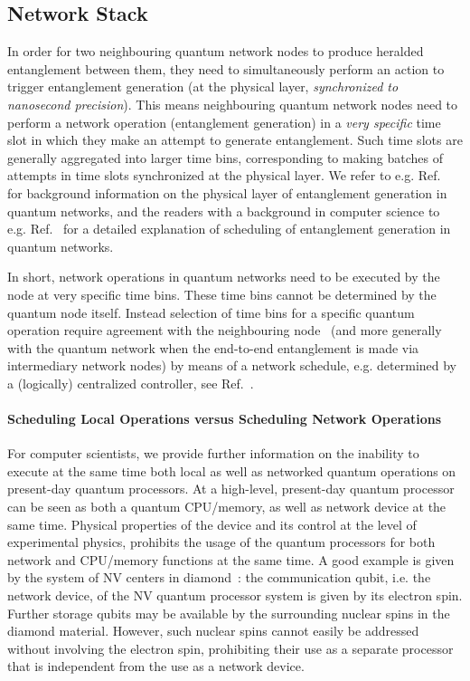 \subsection{Network Stack}
In order for two neighbouring quantum network nodes to produce heralded entanglement between them, they need to simultaneously perform an action to trigger entanglement generation (at the physical layer, \emph{synchronized to nanosecond precision}). This means neighbouring quantum network nodes need to perform a network operation (entanglement generation) in a \emph{very specific} time slot in which they make an attempt to generate entanglement. Such time slots are generally aggregated into larger time bins, corresponding to making batches of attempts in time slots synchronized at the physical layer. We refer to e.g. Ref.~\cite{pompili_2022_experimental} for background information on the physical layer of entanglement generation in quantum networks, and the readers with a background in computer science to e.g. Ref.~\cite{dahlberg_2019_egp} for a detailed explanation of scheduling of entanglement generation in quantum networks.

In short, network operations in quantum networks need to be executed by the node at very specific time bins. These time bins cannot be determined by the quantum node itself. Instead selection of time bins for a specific quantum operation require agreement with the neighbouring node~\cite{dahlberg_2019_egp} (and more generally with the quantum network when the end-to-end entanglement is made via intermediary network nodes) by means of a network schedule, e.g. determined by a (logically) centralized controller, see Ref.~\cite{skrzypczyk_2021_arch}.

\paragraph{Scheduling Local Operations versus Scheduling Network Operations}

For computer scientists, we provide further information on the inability to execute at the same time both local as well as networked quantum operations on present-day quantum processors. At a high-level, present-day quantum processor can be seen as both a quantum \ac{CPU}/memory, as well as network device at the same time. Physical properties of the device and its control at the level of experimental physics, prohibits the usage of the quantum processors for both network and \ac{CPU}/memory functions at the same time. A good example is given by the system of \ac{NV} centers in diamond~\cite{kalb_2017_entanglement,humphreys_2018_delivery}: the communication qubit, i.e. the network device, of the \ac{NV} quantum processor system is given by its electron spin. Further storage qubits may be available by the surrounding nuclear spins in the diamond material. However, such nuclear spins cannot easily be addressed without involving the electron spin, prohibiting their use as a separate processor that is independent from the use as a network device. 

